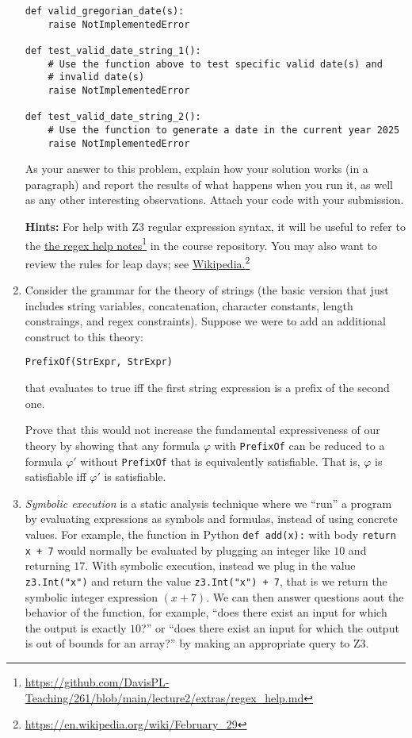 \documentclass{article}
\newcommand{\visiblehref}[2]{\href{#1}{#2}\footnote{\url{#1}}}
\begin{document}
\begin{enumerate}
\begin{verbatim}
def valid_gregorian_date(s):
    raise NotImplementedError

def test_valid_date_string_1():
    # Use the function above to test specific valid date(s) and
    # invalid date(s)
    raise NotImplementedError

def test_valid_date_string_2():
    # Use the function to generate a date in the current year 2025
    raise NotImplementedError
\end{verbatim}

As your answer to this problem, explain how your solution works (in a paragraph) and report the results of what happens when you run it, as well as any other interesting observations.
Attach your code with your submission.

\textbf{Hints:}
For help with Z3 regular expression syntax, it will be useful to refer to the \visiblehref{https://github.com/DavisPL-Teaching/261/blob/main/lecture2/extras/regex\_help.md}{the regex help notes} in the course repository.
You may also want to review the rules for leap days; see \visiblehref{https://en.wikipedia.org/wiki/February\_29}{Wikipedia.}

\item
Consider the grammar for the theory of strings (the basic version that just includes string variables, concatenation, character constants, length constraings, and regex constraints).
Suppose we were to add an additional construct to this theory:
\begin{center}
\texttt{PrefixOf(StrExpr, StrExpr)}
\end{center}
that evaluates to true iff the first string expression is a prefix of the second one.

Prove that this would not increase the fundamental expressiveness of our theory by showing that
any formula $\varphi$ with \texttt{PrefixOf} can be reduced to a formula $\varphi'$ without \texttt{PrefixOf} that is equivalently satisfiable.
That is, $\varphi$ is satisfiable iff $\varphi'$ is satisfiable.

\item
\emph{Symbolic execution} is a static analysis technique where we ``run'' a program by evaluating expressions as symbols and formulas, instead of using concrete values.
For example, the function in Python \texttt{def add(x):} with body \texttt{return x + 7} would normally be evaluated
by plugging an integer like $10$ and returning $17$. With symbolic execution, instead we plug in the value
\texttt{z3.Int("x")} and return the value \texttt{z3.Int("x") + 7}, that is we return the symbolic integer expression $(x + 7)$. We can then answer questions aout the behavior of the function, for example, ``does there exist an input for which the output is exactly $10$?'' or ``does there exist an input for which the output is out of bounds for an array?'' by making an appropriate query to Z3.


\end{enumerate}
\end{document}
